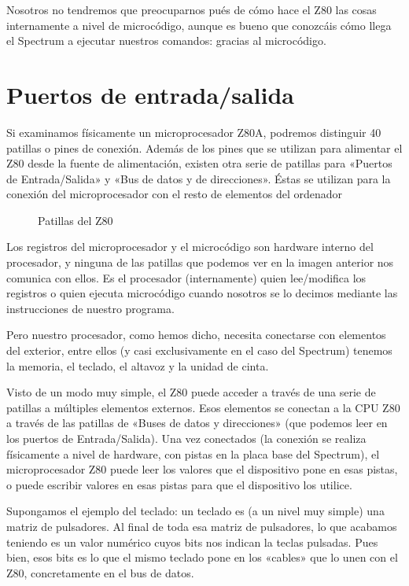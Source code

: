 \documentclass[letterpaper,10pt,spanish]{sphinxmanual}
\begin{document}
Nosotros no tendremos que preocuparnos pués de cómo hace el Z80 las cosas internamente a nivel de microcódigo, aunque es bueno que conozcáis cómo llega el Spectrum a ejecutar nuestros comandos: gracias al microcódigo.


\section{Puertos de entrada/salida}
\label{\detokenize{03_arquitectura/arquitectura:puertos-de-entrada-salida}}
Si examinamos físicamente un microprocesador Z80A, podremos distinguir 40 patillas o pines de conexión. Además de los pines que se utilizan para alimentar el Z80 desde la fuente de alimentación, existen otra serie de patillas para «Puertos de Entrada/Salida» y «Bus de datos y de direcciones». Éstas se utilizan para la conexión del microprocesador con el resto de elementos del ordenador

\begin{figure}[htbp]
\centering
\capstart

\noindent{}
\caption{Patillas del Z80}\label{\detokenize{03_arquitectura/arquitectura:id4}}\end{figure}

Los registros del microprocesador y el microcódigo son hardware interno del procesador, y ninguna de las patillas que podemos ver en la imagen anterior nos comunica con ellos. Es el procesador (internamente) quien lee/modifica los registros o quien ejecuta microcódigo cuando nosotros se lo decimos mediante las instrucciones de nuestro programa.

Pero nuestro procesador, como hemos dicho, necesita conectarse con elementos del exterior, entre ellos (y casi exclusivamente en el caso del Spectrum) tenemos la memoria, el teclado, el altavoz y la unidad de cinta.

Visto de un modo muy simple, el Z80 puede acceder a través de una serie de patillas a múltiples elementos externos. Esos elementos se conectan a la CPU Z80 a través de las patillas de «Buses de datos y direcciones» (que podemos leer en los puertos de Entrada/Salida). Una vez conectados (la conexión se realiza físicamente a nivel de hardware, con pistas en la placa base del Spectrum), el microprocesador Z80 puede leer los valores que el dispositivo pone en esas pistas, o puede escribir valores en esas pistas para que el dispositivo los utilice.

Supongamos el ejemplo del teclado: un teclado es (a un nivel muy simple) una matriz de pulsadores. Al final de toda esa matriz de pulsadores, lo que acabamos teniendo es un valor numérico cuyos bits nos indican la teclas pulsadas. Pues bien, esos bits es lo que el mismo teclado pone en los «cables» que lo unen con el Z80, concretamente en el bus de datos.
\end{document}
